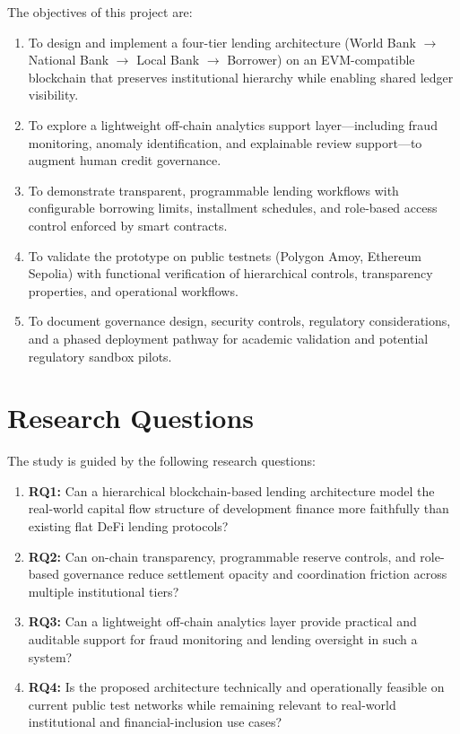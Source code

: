 \documentclass[12pt,a4paper]{report}
\begin{document}
The objectives of this project are:

\begin{enumerate}[noitemsep]
\item To design and implement a four-tier lending architecture (World Bank $\to$ National Bank $\to$ Local Bank $\to$ Borrower) on an EVM-compatible blockchain that preserves institutional hierarchy while enabling shared ledger visibility.
\item To explore a lightweight off-chain analytics support layer---including fraud monitoring, anomaly identification, and explainable review support---to augment human credit governance.
\item To demonstrate transparent, programmable lending workflows with configurable borrowing limits, installment schedules, and role-based access control enforced by smart contracts.
\item To validate the prototype on public testnets (Polygon Amoy, Ethereum Sepolia) with functional verification of hierarchical controls, transparency properties, and operational workflows.
\item To document governance design, security controls, regulatory considerations, and a phased deployment pathway for academic validation and potential regulatory sandbox pilots.
\end{enumerate}

\section{Research Questions}

The study is guided by the following research questions:

\begin{enumerate}[noitemsep]
\item \textbf{RQ1:} Can a hierarchical blockchain-based lending architecture model the real-world capital flow structure of development finance more faithfully than existing flat DeFi lending protocols?
\item \textbf{RQ2:} Can on-chain transparency, programmable reserve controls, and role-based governance reduce settlement opacity and coordination friction across multiple institutional tiers?
\item \textbf{RQ3:} Can a lightweight off-chain analytics layer provide practical and auditable support for fraud monitoring and lending oversight in such a system?
\item \textbf{RQ4:} Is the proposed architecture technically and operationally feasible on current public test networks while remaining relevant to real-world institutional and financial-inclusion use cases?
\end{enumerate}
\end{document}
